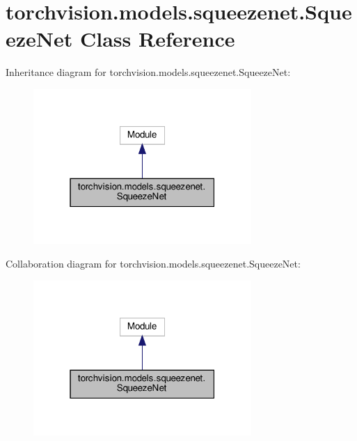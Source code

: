 \hypertarget{classtorchvision_1_1models_1_1squeezenet_1_1SqueezeNet}{}\section{torchvision.\+models.\+squeezenet.\+Squeeze\+Net Class Reference}
\label{classtorchvision_1_1models_1_1squeezenet_1_1SqueezeNet}


Inheritance diagram for torchvision.\+models.\+squeezenet.\+Squeeze\+Net\+:
\nopagebreak
\begin{figure}[H]
\begin{center}
\leavevmode
\includegraphics[width=235pt]{classtorchvision_1_1models_1_1squeezenet_1_1SqueezeNet__inherit__graph}
\end{center}
\end{figure}


Collaboration diagram for torchvision.\+models.\+squeezenet.\+Squeeze\+Net\+:
\nopagebreak
\begin{figure}[H]
\begin{center}
\leavevmode
\includegraphics[width=235pt]{classtorchvision_1_1models_1_1squeezenet_1_1SqueezeNet__coll__graph}
\end{center}
\end{figure}
